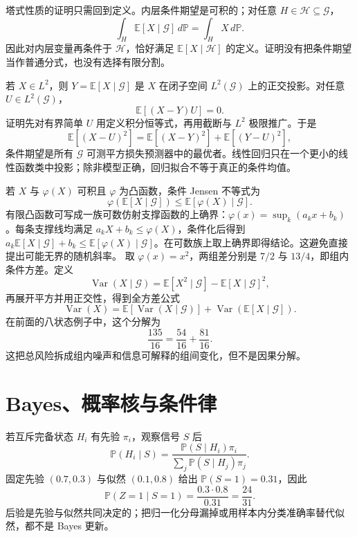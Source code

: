 塔式性质的证明只需回到定义。内层条件期望是可积的；对任意
$H\in\mathcal H\subseteq\mathcal G$，
\[
 \int_H\mathbb E[X\mid\mathcal G]\,d\mathbb P
 =\int_HX\,d\mathbb P.
\]
因此对内层变量再条件于 $\mathcal H$，恰好满足
$\mathbb E[X\mid\mathcal H]$ 的定义。证明没有把条件期望当作普通分式，也没有选择有限分割。


若 $X\in L^2$，则 $Y=\mathbb E[X\mid\mathcal G]$ 是 $X$ 在闭子空间
$L^2(\mathcal G)$ 上的正交投影。对任意 $U\in L^2(\mathcal G)$，
\[
  \mathbb E[(X-Y)U]=0.
\]
证明先对有界简单 $U$ 用定义积分恒等式，再用截断与 $L^2$ 极限推广。于是
\[
 \mathbb E[(X-U)^2]
 =\mathbb E[(X-Y)^2]+\mathbb E[(Y-U)^2],
\]
条件期望是所有 $\mathcal G$ 可测平方损失预测器中的最优者。线性回归只在一个更小的线性函数类中投影；除非模型正确，回归拟合不等于真正的条件均值。



若 $X$ 与 $\varphi(X)$ 可积且 $\varphi$ 为凸函数，条件 Jensen 不等式为
\[
  \varphi(\mathbb E[X\mid\mathcal G])
  \le \mathbb E[\varphi(X)\mid\mathcal G].
\]
有限凸函数可写成一族可数仿射支撑函数的上确界：$\varphi(x)=\sup_k(a_kx+b_k)$。每条支撑线均满足 $a_kX+b_k\le\varphi(X)$，条件化后得到 $a_k\mathbb E[X\mid\mathcal G]+b_k\le\mathbb E[\varphi(X)\mid\mathcal G]$。在可数族上取上确界即得结论。这避免直接提出可能无界的随机斜率。
取 $\varphi(x)=x^2$，两组差分别是 $7/2$ 与 $13/4$，即组内条件方差。定义
\[
 \operatorname{Var}(X\mid\mathcal G)
 =\mathbb E[X^2\mid\mathcal G]
  -\mathbb E[X\mid\mathcal G]^2,
\]
再展开平方并用正交性，得到全方差公式
\[
 \operatorname{Var}(X)
 =\mathbb E[\operatorname{Var}(X\mid\mathcal G)]
 +\operatorname{Var}(\mathbb E[X\mid\mathcal G]).
\]
在前面的八状态例子中，这个分解为
\[
  \frac{135}{16}=\frac{54}{16}+\frac{81}{16}.
\]
这把总风险拆成组内噪声和信息可解释的组间变化，但不是因果分解。

\section{Bayes、概率核与条件律}

若互斥完备状态 $H_i$ 有先验 $\pi_i$，观察信号 $S$ 后
\[
 \mathbb P(H_i\mid S)
 =\frac{\mathbb P(S\mid H_i)\pi_i}
        {\sum_j\mathbb P(S\mid H_j)\pi_j}.
\]
固定先验 $(0.7,0.3)$ 与似然 $(0.1,0.8)$ 给出
$\mathbb P(S=1)=0.31$，因此
\[
  \mathbb P(Z=1\mid S=1)=\frac{0.3\cdot0.8}{0.31}=\frac{24}{31}.
\]
后验是先验与似然共同决定的；把归一化分母漏掉或用样本内分类准确率替代似然，都不是 Bayes 更新。


